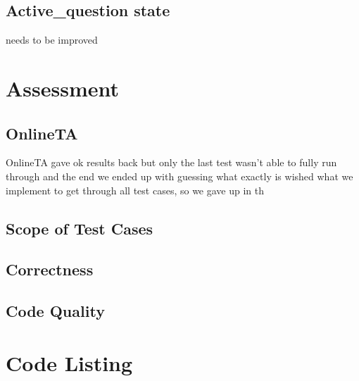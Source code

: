 \documentclass[12pt,a4paper]{article}
\begin{document}
\subsection{Active\_question state}

needs to be improved

\section{Assessment}

\subsection{OnlineTA}
OnlineTA gave ok results back but only the last test wasn't able to fully run through and the end we ended up with guessing what exactly is wished what we implement to get through all test cases, so we gave up in th

\subsection{Scope of Test Cases}

\subsection{Correctness}

\subsection{Code Quality}


\appendix
\section{Code Listing}
\end{document}
